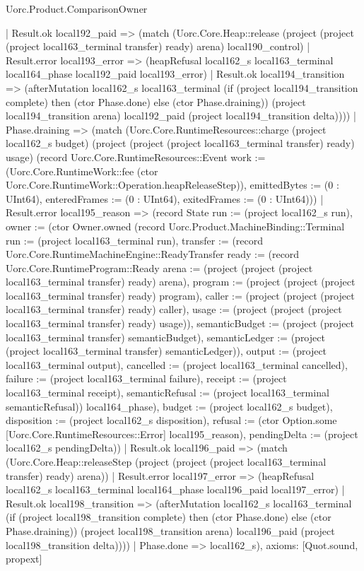 \begin{lexlean}{Uorc.Product.ComparisonOwner}
\begin{semanticmodule}
{      | Result.ok local192_paid => (match (Uorc.Core.Heap::release (project (project (project local163_terminal transfer) ready) arena) local190_control)
        | Result.error local193_error => (heapRefusal local162_s local163_terminal local164_phase local192_paid local193_error)
        | Result.ok local194_transition => (afterMutation local162_s local163_terminal (if (project local194_transition complete) then (ctor Phase.done) else (ctor Phase.draining)) (project local194_transition arena) local192_paid (project local194_transition delta))))
    | Phase.draining => (match (Uorc.Core.RuntimeResources::charge (project local162_s budget) (project (project (project local163_terminal transfer) ready) usage) (record Uorc.Core.RuntimeResources::Event {work := (Uorc.Core.RuntimeWork::fee (ctor Uorc.Core.RuntimeWork::Operation.heapReleaseStep)), emittedBytes := (0 : UInt64), enteredFrames := (0 : UInt64), exitedFrames := (0 : UInt64)}))
      | Result.error local195_reason => (record State {run := (project local162_s run), owner := (ctor Owner.owned (record Uorc.Product.MachineBinding::Terminal {run := (project local163_terminal run), transfer := (record Uorc.Core.RuntimeMachineEngine::ReadyTransfer {ready := (record Uorc.Core.RuntimeProgram::Ready {arena := (project (project (project local163_terminal transfer) ready) arena), program := (project (project (project local163_terminal transfer) ready) program), caller := (project (project (project local163_terminal transfer) ready) caller), usage := (project (project (project local163_terminal transfer) ready) usage)}), semanticBudget := (project (project local163_terminal transfer) semanticBudget), semanticLedger := (project (project local163_terminal transfer) semanticLedger)}), output := (project local163_terminal output), cancelled := (project local163_terminal cancelled), failure := (project local163_terminal failure), receipt := (project local163_terminal receipt), semanticRefusal := (project local163_terminal semanticRefusal)}) local164_phase), budget := (project local162_s budget), disposition := (project local162_s disposition), refusal := (ctor Option.some [Uorc.Core.RuntimeResources::Error] local195_reason), pendingDelta := (project local162_s pendingDelta)})
      | Result.ok local196_paid => (match (Uorc.Core.Heap::releaseStep (project (project (project local163_terminal transfer) ready) arena))
        | Result.error local197_error => (heapRefusal local162_s local163_terminal local164_phase local196_paid local197_error)
        | Result.ok local198_transition => (afterMutation local162_s local163_terminal (if (project local198_transition complete) then (ctor Phase.done) else (ctor Phase.draining)) (project local198_transition arena) local196_paid (project local198_transition delta))))
    | Phase.done => local162_s),
  axioms: [Quot.sound, propext]
}


\end{semanticmodule}
\end{lexlean}
